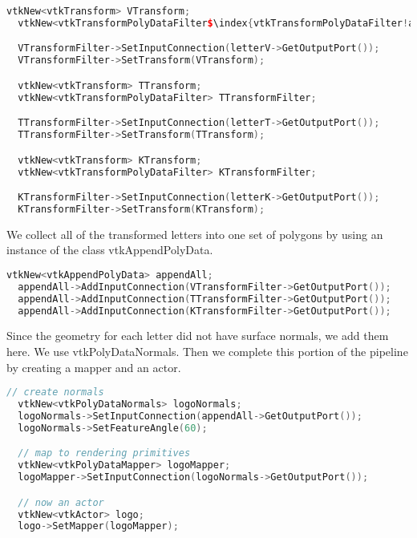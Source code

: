 \begin{lstlisting}[language=C++, caption={Transform each letter into ita appropriate location.}, escapechar=\$]
  vtkNew<vtkTransform> VTransform;
  vtkNew<vtkTransformPolyDataFilter$\index{vtkTransformPolyDataFilter!application}$> VTransformFilter;

  VTransformFilter->SetInputConnection(letterV->GetOutputPort());
  VTransformFilter->SetTransform(VTransform);

  vtkNew<vtkTransform> TTransform;
  vtkNew<vtkTransformPolyDataFilter> TTransformFilter;

  TTransformFilter->SetInputConnection(letterT->GetOutputPort());
  TTransformFilter->SetTransform(TTransform);

  vtkNew<vtkTransform> KTransform;
  vtkNew<vtkTransformPolyDataFilter> KTransformFilter;

  KTransformFilter->SetInputConnection(letterK->GetOutputPort());
  KTransformFilter->SetTransform(KTransform);
\end{lstlisting}

\noindent We collect all of the transformed letters into one set of polygons by using an instance of the class vtkAppendPolyData.

\begin{lstlisting}[language=C++, caption={Collect the transformed letters into one set of polygons.}]
  vtkNew<vtkAppendPolyData> appendAll;
  appendAll->AddInputConnection(VTransformFilter->GetOutputPort());
  appendAll->AddInputConnection(TTransformFilter->GetOutputPort());
  appendAll->AddInputConnection(KTransformFilter->GetOutputPort());
\end{lstlisting}

\noindent Since the geometry for each letter did not have surface normals, we add them here. We use vtkPolyDataNormals. Then we complete this portion of the pipeline by creating a mapper and an actor.

\begin{lstlisting}[language=C++, caption={Add surface normals and create mapper and actor.}]
  // create normals
  vtkNew<vtkPolyDataNormals> logoNormals;
  logoNormals->SetInputConnection(appendAll->GetOutputPort());
  logoNormals->SetFeatureAngle(60);

  // map to rendering primitives
  vtkNew<vtkPolyDataMapper> logoMapper;
  logoMapper->SetInputConnection(logoNormals->GetOutputPort());

  // now an actor
  vtkNew<vtkActor> logo;
  logo->SetMapper(logoMapper);
\end{lstlisting}

